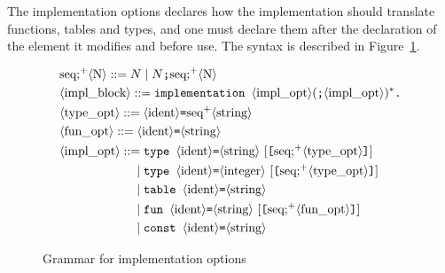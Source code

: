 The implementation options declares how the implementation should translate
functions, tables and types, and one must declare them after the
declaration of the element it modifies and before use.  
The syntax is described in 
Figure~\ref{fig:syntaximpl}.

\newcommand{\neseqsemi}[1]{\textrm{seq;}^+\nonterm{#1}}
\begin{figure}
\def\phio{\phantom{\nonterm{impl\_opt} = }\mid}
\begin{align*}
&\neseqsemi{N} ::= N \mid N \texttt{;} \neseqsemi{N}\\
&\nonterm{impl\_block} ::= \texttt{implementation
}\nonterm{impl\_opt}(\texttt{;}\nonterm{impl\_opt})^*\texttt{.}\\
&\nonterm{type\_opt} ::= \nonterm{ident}\texttt{=}\neseq{string}\\
&\nonterm{fun\_opt} ::= \nonterm{ident}\texttt{=}\nonterm{string}\\
&\nonterm{impl\_opt} ::= \texttt{type }\nonterm{ident}\texttt{=}\nonterm{string}
\ [\texttt{[}\neseqsemi{type\_opt}\texttt{]}]\\
&\phio\texttt{type }\nonterm{ident}\texttt{=}
\nonterm{integer}\ [\texttt{[}\neseqsemi{type\_opt}\texttt{]}]\\
&\phio\texttt{table }\nonterm{ident}\texttt{=}\nonterm{string}\\
&\phio\texttt{fun }\nonterm{ident}\texttt{=}\nonterm{string}\ 
[\texttt{[}\neseqsemi{fun\_opt}\texttt{]}]\\
&\phio\texttt{const }\nonterm{ident}\texttt{=}\nonterm{string}
\end{align*}
\caption{Grammar for implementation options}
\label{fig:syntaximpl}
\end{figure}

